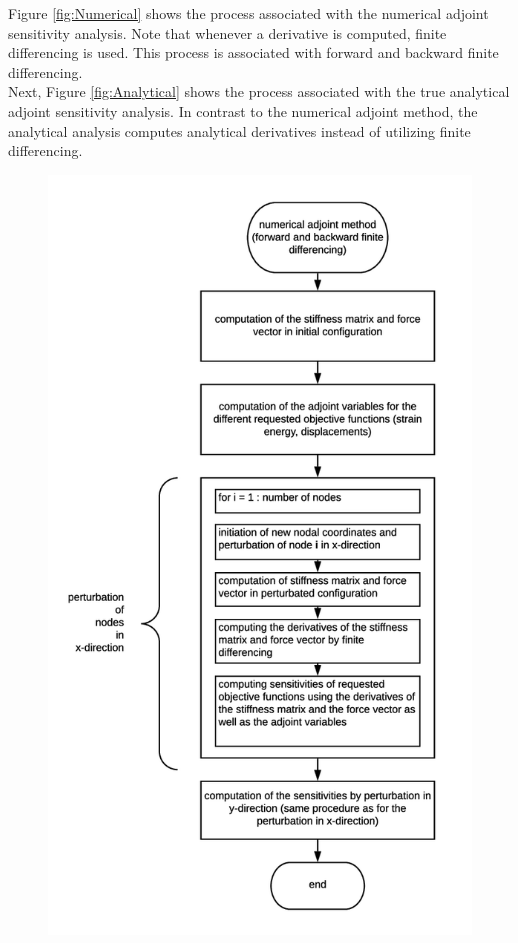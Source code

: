 Figure \ref{fig:Numerical} shows the process associated with the numerical adjoint sensitivity analysis. Note that whenever a derivative is computed, finite differencing is used. This process is associated with forward and backward finite differencing.\\[3pt]
Next, Figure \ref{fig:Analytical} shows the process associated with the true analytical adjoint sensitivity analysis. In contrast to the numerical adjoint method, the analytical analysis computes analytical derivatives instead of utilizing finite differencing.\\[3pt]
\begin{figure}[ht]
\centering
\begin{minipage}{.5\textwidth}
  \centering
  \includegraphics[width=1.0\linewidth]{images/numericaladjoint.png}

\end{minipage}
\end{figure}
